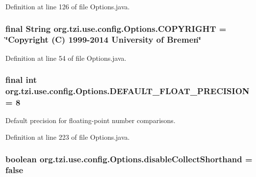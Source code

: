 Definition at line 126 of file Options.\-java.

\hypertarget{classorg_1_1tzi_1_1use_1_1config_1_1_options_ad8fe85cb4748a041701dce3bcb988564}{
\subsubsection[{C\-O\-P\-Y\-R\-I\-G\-H\-T}]{\setlength{\rightskip}{0pt plus 5cm}final String org.\-tzi.\-use.\-config.\-Options.\-C\-O\-P\-Y\-R\-I\-G\-H\-T = \char`\"{}Copyright (C) 1999-\/2014 University of Bremen\char`\"{}\hspace{0.3cm}{\ttfamily [static]}}}\label{classorg_1_1tzi_1_1use_1_1config_1_1_options_ad8fe85cb4748a041701dce3bcb988564}


Definition at line 54 of file Options.\-java.

\hypertarget{classorg_1_1tzi_1_1use_1_1config_1_1_options_a08249b776553a56c6ad36a15621eac41}{
\subsubsection[{D\-E\-F\-A\-U\-L\-T\-\_\-\-F\-L\-O\-A\-T\-\_\-\-P\-R\-E\-C\-I\-S\-I\-O\-N}]{\setlength{\rightskip}{0pt plus 5cm}final int org.\-tzi.\-use.\-config.\-Options.\-D\-E\-F\-A\-U\-L\-T\-\_\-\-F\-L\-O\-A\-T\-\_\-\-P\-R\-E\-C\-I\-S\-I\-O\-N = 8\hspace{0.3cm}{\ttfamily [static]}}}\label{classorg_1_1tzi_1_1use_1_1config_1_1_options_a08249b776553a56c6ad36a15621eac41}
Default precision for floating-\/point number comparisons. 

Definition at line 223 of file Options.\-java.

\hypertarget{classorg_1_1tzi_1_1use_1_1config_1_1_options_afd650554b2ebcd9702bf4b64aec94868}{
\subsubsection[{disable\-Collect\-Shorthand}]{\setlength{\rightskip}{0pt plus 5cm}boolean org.\-tzi.\-use.\-config.\-Options.\-disable\-Collect\-Shorthand = false\hspace{0.3cm}{\ttfamily [static]}}}\label{classorg_1_1tzi_1_1use_1_1config_1_1_options_afd650554b2ebcd9702bf4b64aec94868}


